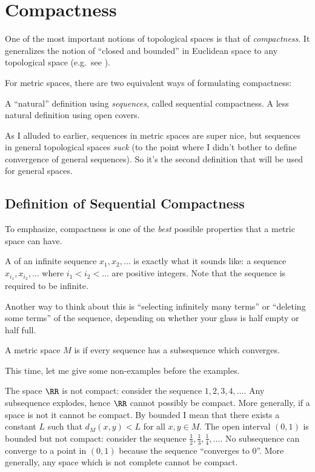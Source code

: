 \chapter{Compactness}
One of the most important notions of topological spaces is that of \emph{compactness}.
It generalizes the notion of ``closed and bounded'' in Euclidean space to any topological space
(e.g.\ see ).

For metric spaces, there are two equivalent ways of formulating compactness:
\begin{itemize}
	\ii A ``natural'' definition using \emph{sequences}, called sequential compactness.
	\ii A less natural definition using open covers.
\end{itemize}
As I alluded to earlier, sequences in metric spaces are super nice,
but sequences in general topological spaces \emph{suck} (to the point where
I didn't bother to define convergence of general sequences).
So it's the second definition that will be used for general spaces.

\section{Definition of Sequential Compactness}
To emphasize, compactness is one of the
\emph{best} possible properties that a metric space can have.
\begin{definition}
	A  of an infinite sequence $x_1, x_2, \dots$ is exactly
	what it sounds like: a sequence $x_{i_1}, x_{i_2}, \dots$
	where $i_1 < i_2 < \dots$ are positive integers.
	Note that the sequence is required to be infinite.
\end{definition}
Another way to think about this is ``selecting infinitely many terms''
or ``deleting some terms'' of the sequence, depending on whether
your glass is half empty or half full.

\begin{definition}
	A metric space $M$ is  if
	every sequence has a subsequence which converges.
\end{definition}
This time, let me give some non-examples before the examples.
\begin{example}
	\listhack
	\begin{enumerate}[(a)]
		\ii The space $\RR$ is not compact: consider the sequence $1,2,3,4,\dots$.
		Any subsequence explodes, hence $\RR$ cannot possibly be compact.
		\ii More generally, if a space is not  it cannot be compact.
		By bounded I mean that there exists a constant $L$ such that $d_M(x,y) < L$ for all $x,y \in M$.
		\ii The open interval $(0,1)$ is bounded but not compact: consider the sequence $\frac12, \frac13, \frac14, \dots$.
		No subsequence can converge to a point in $(0,1)$ because the sequence ``converges to $0$''.
		\ii More generally, any space which is not complete cannot be compact.
	\end{enumerate}
\end{example}

